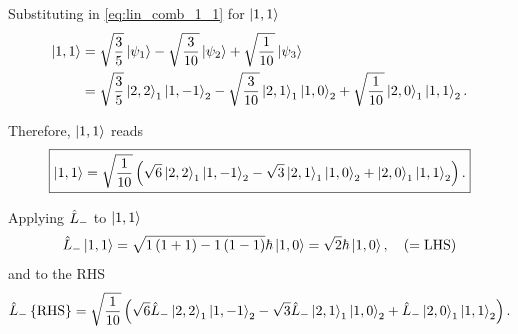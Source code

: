 Substituting in \cref{eq:lin_comb_1_1} for $\Ket{1,1}$
\begin{align}
    \notag
    \Ket{1,1} &=
    \sqrt{\frac{3}{5}} \Ket{\psi_1}
    -\sqrt{\frac{3}{10}} \Ket{\psi_2}
    + \sqrt{\frac{1}{10}} \Ket{\psi_3}
    \\
    &=
    \sqrt{\frac{3}{5}} \Ket{2,2}_1 \Ket{1,-1}_2
    -\sqrt{\frac{3}{10}} \Ket{2,1}_1 \Ket{1,0}_2
    + \sqrt{\frac{1}{10}} \Ket{2,0}_1 \Ket{1,1}_2.
\end{align}

Therefore, $\Ket{1,1}$ reads 
\begin{equation}
    \boxed{
        \Ket{1,1} =
        \sqrt{\frac{1}{10}} \left(
            \sqrt{6} \Ket{2,2}_1 \Ket{1,-1}_2
            -\sqrt{3} \Ket{2,1}_1 \Ket{1,0}_2
            + \Ket{2,0}_1 \Ket{1,1}_2
        \right).
    }
\end{equation}

Applying $\hat{L}_{-}$ to $\Ket{1,1}$ 
\begin{equation}\label{eq:LHS_1_0}
    \hat{L}_{-} \Ket{1,1} =
    \sqrt{1\left( 1 + 1 \right) - 1\left( 1 - 1 \right)} \hbar \Ket{1,0} =
    \sqrt{2} \hbar \Ket{1,0},
    \quad \left( =\text{LHS} \right)
\end{equation}
and to the RHS 
\begin{equation}\label{eq:RHS_1_0_aux}
    \hat{L}_{-} \left\{ \text{RHS} \right\} =
    \sqrt{\frac{1}{10}} \left(
        \sqrt{6} 
        \hat{L}_{-} \Ket{2,2}_1 \Ket{1,-1}_2
        -\sqrt{3} 
        \hat{L}_{-} \Ket{2,1}_1 \Ket{1,0}_2
        + 
        \hat{L}_{-} \Ket{2,0}_1 \Ket{1,1}_2
    \right).
\end{equation}

